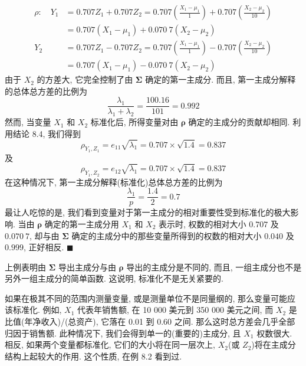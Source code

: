 
\[
\begin{aligned}
\rho:\quad Y_1&=0.707Z_1+0.707Z_2=0.707\left(\frac{X_1-\mu_1}{1}\right)+0.707\left(\frac{X_2-\mu_2}{10}\right)\\
&=0.707(X_1-\mu_1)+0.070\ 7(X_2-\mu_2)\\
Y_2&=0.707Z_1-0.707Z_2=0.707\left(\frac{X_1-\mu_1}{1}\right)-0.707\left(\frac{X_2-\mu_2}{10}\right)\\
&=0.707(X_1-\mu_1)-0.070\ 7(X_2-\mu_2)
\end{aligned}
\]
由于 $X_2$ 的方差大, 它完全控制了由 $\boldsymbol{\Sigma}$ 确定的第一主成分. 而且, 第一主成分解释的总体总方差的比例为
\[
\frac{\lambda_1}{\lambda_1+\lambda_2}=\frac{100.16}{101}=0.992
\]
然而, 当变量 $X_1$ 和 $X_2$ 标准化后, 所得变量对由 $\boldsymbol{\rho}$ 确定的主成分的贡献却相同. 利用结论 8.4, 我们得到
\[
\rho_{Y_1,Z_1}=e_{11}\sqrt{\lambda_1}=0.707\times\sqrt{1.4}=0.837
\]
及
\[
\rho_{Y_1,Z_2}=e_{12}\sqrt{\lambda_1}=0.707\times\sqrt{1.4}=0.837
\]
在这种情况下, 第一主成分解释(标准化)总体总方差的比例为
\[
\frac{\lambda_1}{p}=\frac{1.4}{2}=0.7
\]
最让人吃惊的是, 我们看到变量对于第一主成分的相对重要性受到标准化的极大影响. 当由 $\boldsymbol{\rho}$ 确定的第一主成分用 $X_1$ 和 $X_2$ 表示时, 权数的相对大小 $0.707$ 及 $0.070\ 7$, 却与由 $\boldsymbol{\Sigma}$ 确定的主成分中的那些变量所得到的权数的相对大小 $0.040$ 及 $0.999$, 正好相反. \hfill$\blacksquare$

上例表明由 $\boldsymbol{\Sigma}$ 导出主成分与由 $\boldsymbol{\rho}$ 导出的主成分是不同的, 而且, 一组主成分也不是另外一组主成分的简单函数. 这说明, 标准化不是无关紧要的.

如果在极其不同的范围内测量变量, 或是测量单位不是同量纲的, 那么变量可能应该标准化. 例如, $X_1$ 代表年销售额, 在 10 000 美元到 350 000 美元之间, 而 $X_2$ 是比值(年净收入)/(总资产), 它落在 0.01 到 0.60 之间. 那么这时总方差会几乎全部归因于销售额. 此种情况下, 我们会得到单一的(重要的)主成分, 且 $X_1$ 权数很大. 相反, 如果两个变量都标准化, 它们的大小将在同一层次上, $X_2$(或 $Z_2$)将在主成分结构上起较大的作用. 这个性质, 在例 8.2 看到过.



